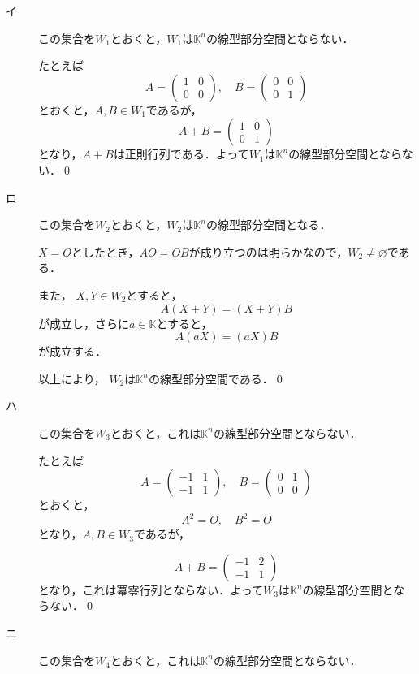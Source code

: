 \documentclass[uplatex,dvipdfmx,a4paper,11pt,fleqn]{jsarticle}
\begin{document}
\begin{leftbar}
    \begin{description}
        \item[イ] この集合を$W_1$とおくと，$W_1$は$\mathbb{K}^n$の線型部分空間とならない．
        
        たとえば
        \[
            A = \begin{pmatrix} 1 & 0 \\ 0 & 0 \end{pmatrix},\quad B = \begin{pmatrix} 0 & 0 \\ 0 & 1 \end{pmatrix}
        \]
        とおくと，$ A , B \in W_1$であるが，
        \[
            A + B = \begin{pmatrix} 1 & 0 \\ 0 & 1 \end{pmatrix}
        \]
        となり，$A+B$は正則行列である．よって$W_1$は$\mathbb{K}^n$の線型部分空間とならない．\qed 
        \item[ロ] この集合を$W_2$とおくと，$W_2$は$\mathbb{K}^n$の線型部分空間となる．
        
        $X =O$としたとき，$A O = OB$が成り立つのは明らかなので，$ W_2 \ne \varnothing$である．

        また， $X,Y \in W_2$とすると，
        \[
            A(X+Y)=(X+Y)B 
        \]
        が成立し，さらに$ a\in \mathbb{K}$とすると，
        \[
            A(aX)=(aX)B
        \]
        が成立する．

        以上により， $W_2$は$\mathbb{K}^n$の線型部分空間である．\qed 
        \item[ハ] この集合を$W_3$とおくと，これは$\mathbb{K}^n$の線型部分空間とならない．
        
        たとえば
        \[
            A = \begin{pmatrix} -1 & 1 \\ -1 & 1 \end{pmatrix} , \quad B = \begin{pmatrix} 0 & 1 \\ 0 & 0 \end{pmatrix}
        \]
        とおくと，
        \[
            A^2 = O , \quad B^2 =O
        \]
        となり，$A ,B \in W_3$であるが，

        \[
            A+B = \begin{pmatrix} -1 & 2\\-1 & 1\end{pmatrix}
        \]
        となり，これは冪零行列とならない．よって$W_3$は$\mathbb{K}^n$の線型部分空間とならない．\qed 
        \item[ニ]この集合を$W_4$とおくと，これは$\mathbb{K}^n$の線型部分空間とならない．
        

\end{description}
\end{leftbar}
\end{document}
